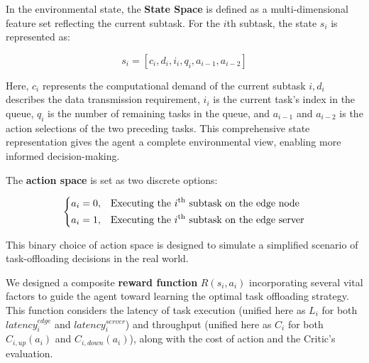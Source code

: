\documentclass[preprint,12pt]{elsarticle}
\begin{document}
In the environmental state, the \textbf{State Space} is defined as a multi-dimensional feature set reflecting the current subtask. For the \(i\)th subtask, the state \(s_i\) is represented as:

\begin{equation}
    s_i=[c_i,d_i,i_i,q_i,a_{i-1},a_{i-2} ]
\end{equation}

Here, \(c_i\) represents the computational demand of the current subtask \(i,d_i\) describes the data transmission requirement, \(i_i\) is the current task's index in the queue, \(q_i\) is the number of remaining tasks in the queue, and \(a_{i-1}\) and \(a_{i-2}\) is the action selections of the two preceding tasks. This comprehensive state representation gives the agent a complete environmental view, enabling more informed decision-making.

The \textbf{action space} is set as two discrete options:


\begin{equation}
    \label{eq:17}
    \left\{
        \begin{aligned}
            &a_i=0, && \text{Executing the } i\textsuperscript{th} \text{ subtask on the edge node}\\
            &a_i=1, && \text{Executing the } i\textsuperscript{th} \text{ subtask on the edge server}
        \end{aligned}
    \right.
\end{equation}



This binary choice of action space is designed to simulate a simplified scenario of task-offloading decisions in the real world.

We designed a composite \textbf{reward function} \(R(s_i,a_i)\) incorporating several vital factors to guide the agent toward learning the optimal task offloading strategy. This function considers the latency of task execution (unified here as \(L_i\) for both \(latency_i^{edge}\) and \(latency_i^{server}\))  and throughput (unified here as \(C_i\) for both \(C_{i, up} (a_i)\) and \(C_{i, down} (a_i)\)), along with the cost of action and the Critic's evaluation.
\end{document}
